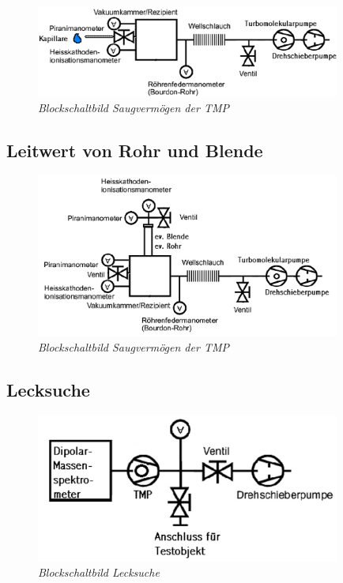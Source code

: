 \begin{figure}[h]
	\includegraphics[width=100mm]{Saug}
	\centering
	\caption{\itshape Blockschaltbild Saugvermögen der TMP}
	\label{fig:3}
\end{figure}
\noindent


\noindent
\newpage
\subsection{Leitwert von Rohr und Blende}

\begin{figure}[h]
	\includegraphics[width=100mm]{LeitwertVonRohrUndBlende}
	\centering
	\caption{\itshape Blockschaltbild Saugvermögen der TMP}
	\label{fig:5}
\end{figure}

\noindent


\noindent



\subsection{Lecksuche}

\begin{figure}[h]
	\includegraphics[width=100mm]{GegenstromLecksuche}
	\centering
	\caption{\itshape Blockschaltbild Lecksuche}
	\label{fig:8}
\end{figure}
